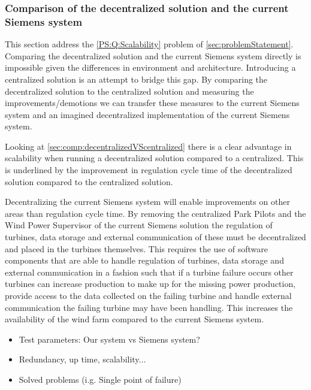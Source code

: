 \subsubsection{Comparison of the decentralized solution and the current Siemens system}
This section address the \ref{PS:Q:Scalability} problem of \cref{sec:problemStatement}.
Comparing the decentralized solution and the current Siemens system directly is impossible given the differences in environment and architecture. Introducing a centralized solution is an attempt to bridge this gap. By comparing the decentralized solution to the centralized solution and measuring the improvements/demotions we can transfer these measures to the current Siemens system and an imagined decentralized implementation of the current Siemens system.

Looking at \cref{sec:comp:decentralizedVScentralized} there is a clear advantage in scalability when running a decentralized solution compared to a centralized. This is underlined by the improvement in regulation cycle time of the decentralized solution compared to the centralized solution.

Decentralizing the current Siemens system will enable improvements on other areas than regulation cycle time. By removing the centralized Park Pilots and the Wind Power Supervisor of the current Siemens solution the regulation of turbines, data storage and external communication of these must be decentralized and placed in the turbines themselves. This requires the use of software components that are able to handle regulation of turbines, data storage and external communication in a fashion such that if a turbine failure occurs other turbines can increase production to make up for the missing power production, provide access to the data collected on the failing turbine and handle external communication the failing turbine may have been handling. This increases the availability of the wind farm compared to the current Siemens system.

\begin{itemize}
	\item Test parameters: Our system vs Siemens system?
	\item Redundancy, up time, scalability...
	\item Solved problems (i.g. Single point of failure)
\end{itemize}


